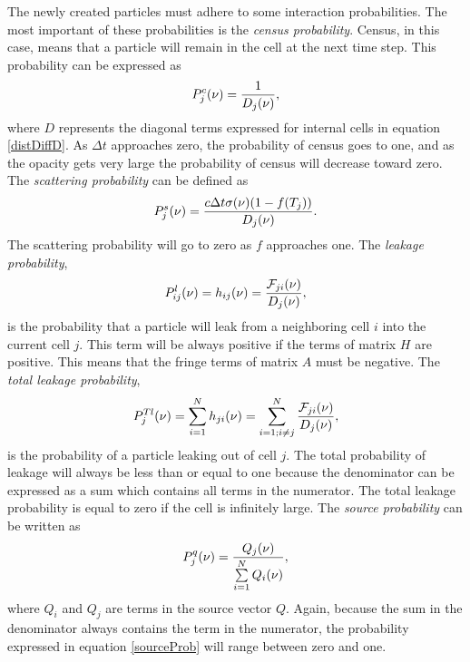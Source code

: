	The newly created particles must adhere to some interaction probabilities. The most important of these probabilities is the {\it census probability}. Census, in this case, means that a particle will remain in the cell at the next time step. This probability can be expressed as
	\begin{equation}
	\label{censusProb}
	P^c_j(\nu)={1\over{D_j(\nu)}},
	\end{equation}
	where $D$ represents the diagonal terms expressed for internal cells in equation \ref{distDiffD}. As $\Delta{t}$ approaches zero, the probability of census goes to one, and as the opacity gets very large the probability of census will decrease toward zero. The {\it scattering probability} can be defined as 
	\begin{equation}
	\label{absorptionProb}
	P^s_j(\nu)={c\Delta{t}\sigma(\nu){(1-f(T_j))}\over{D_j(\nu)}}.
	\end{equation}
	The scattering probability will go to zero as $f$ approaches one. The {\it leakage probability}, 
	\begin{equation}
	\label{leakageProb}
	P^l_{ij}(\nu)=h_{ij}(\nu)={\mathcal{F}_{ji}(\nu)\over{D_j(\nu)}},
	\end{equation}
	is the probability that a particle will leak from a neighboring cell $i$ into the current cell $j$. This term will be always positive if the terms of matrix $H$ are positive. This means that the fringe terms of matrix $A$ must be negative. The {\it total leakage probability},  
	\begin{equation}
	\label{totalLeakageProb}
	P^{Tl}_j(\nu)=\sum_{i=1}^N{h_{ji}(\nu)}=\sum_{i=1;i\neq{j}}^N{\mathcal{F}_{ji}(\nu)\over{D_j(\nu)}},
	\end{equation}
	is the probability of a particle leaking out of cell $j$. The total probability of leakage will always be less than or equal to one because the denominator can be expressed as a sum which contains all terms in the numerator.  The total leakage probability is equal to zero if the cell is infinitely large. The {\it source probability} can be written as
	\begin{equation}
	\label{sourceProb}
	P^q_j(\nu)={Q_j(\nu)\over{\sum\limits_{i=1}^N{Q_i(\nu)}}},
	\end{equation}
	where $Q_i$ and $Q_j$ are terms in the source vector $Q$. Again, because the sum in the denominator always contains the term in the numerator, the probability expressed in equation \ref{sourceProb} will range between zero and one.

